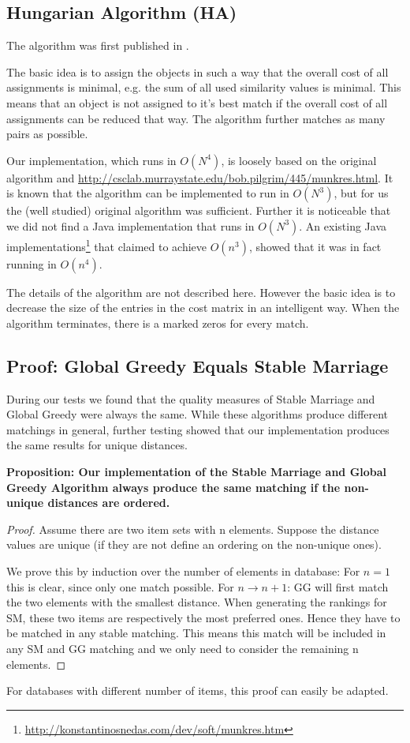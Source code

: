 \documentclass[a4paper,11pt]{article}
\begin{document}
\subsection{Hungarian Algorithm (HA)}

The algorithm was first published in \cite{ha_firstpub}.

The basic idea is to assign the objects in such a way that the overall cost of all assignments is minimal, e.g. the sum of all used similarity values is minimal. This means that an object is not assigned to it's best match if the overall cost of all assignments can be reduced that way. The algorithm further matches as many pairs as possible.

Our implementation, which runs in $O(N^4)$, is loosely based on the original algorithm and  \url{http://csclab.murraystate.edu/bob.pilgrim/445/munkres.html}. It is known that the algorithm can be implemented to run in $O(N^3)$, but for us the (well studied) original algorithm was sufficient. Further it is noticeable that we did not find a Java implementation that runs in $O(N^3)$. An existing Java implementations\footnote{\url{http://konstantinosnedas.com/dev/soft/munkres.htm}} that claimed to achieve $O(n^{3})$, showed that it was in fact running in $O(n^{4})$.

The details of the algorithm are not described here. However the basic idea is to decrease the size of the entries in the cost matrix in an intelligent way. When the algorithm terminates, there is a marked zeros for every match. 

\subsection{Proof: Global Greedy Equals Stable Marriage}

During our tests we found that the quality measures of Stable Marriage and Global Greedy were
always the same. While these algorithms produce different matchings in general, further testing showed
that our implementation produces the same results for unique distances.

\textbf{Proposition: Our implementation of the Stable Marriage and Global Greedy Algorithm always produce the same matching if the non-unique distances are ordered.}
\begin{proof}
Assume there are two item sets with n elements.
Suppose the distance values are unique
(if they are not define an ordering on the non-unique ones).

We prove this by induction over the number of elements in database:
For $n = 1$ this is clear, since only one match possible.
For $n \rightarrow n + 1$: 
GG will first match the two elements with the smallest distance.
When generating the rankings for SM, these two items are respectively the most preferred ones.
Hence they have to be matched in any stable matching.
This means this match will be included in any SM and GG matching
and we only need to consider the remaining n elements.
\end{proof}
For databases with different number of items, this proof can easily be adapted.
\end{document}
